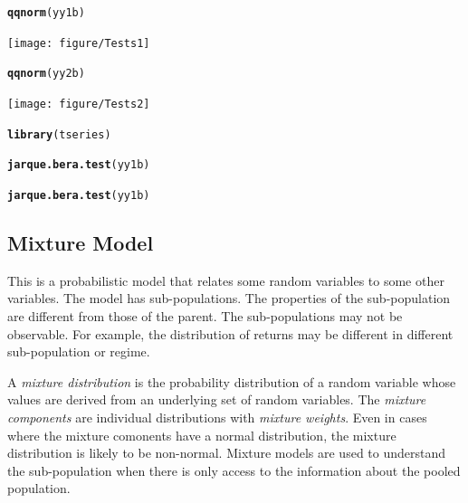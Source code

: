\documentclass[12pt, a4paper, oneside]{article}\usepackage[]{graphicx}\usepackage[]{color}
\makeatletter
\newcommand{\hlkwd}[1]{\textcolor[rgb]{0.737,0.353,0.396}{\textbf{#1}}}%
\newenvironment{kframe}{%
 \def\at@end@of@kframe{}%
 \ifinner\ifhmode%
  \def\at@end@of@kframe{\end{minipage}}%
  \begin{minipage}{\columnwidth}%
 \fi\fi%
 \def\FrameCommand##1{\hskip\@totalleftmargin \hskip-\fboxsep
 \colorbox{shadecolor}{##1}\hskip-\fboxsep
     \hskip-\linewidth \hskip-\@totalleftmargin \hskip\columnwidth}%
 \MakeFramed {\advance\hsize-\width
   \@totalleftmargin\z@ \linewidth\hsize
   \@setminipage}}%
 {\par\unskip\endMakeFramed%
 \at@end@of@kframe}
\newenvironment{knitrout}{}{} %
\makeatother
\begin{document}
\begin{knitrout}
\color{fgcolor}\begin{kframe}
\begin{alltt}
\hlkwd{qqnorm}(yy1b)
\end{alltt}
\end{kframe}
\texttt{[image: figure/Tests1]} 
\begin{kframe}\begin{alltt}
\hlkwd{qqnorm}(yy2b)
\end{alltt}
\end{kframe}
\texttt{[image: figure/Tests2]} 
\begin{kframe}\begin{alltt}
\hlkwd{library}(tseries)
\end{alltt}


{\ttfamily\noindent\bfseries\color{errorcolor}{\#\# Error: there is no package called 'tseries'}}\begin{alltt}
\hlkwd{jarque.bera.test}(yy1b)
\end{alltt}


{\ttfamily\noindent\bfseries{}}\begin{alltt}
\hlkwd{jarque.bera.test}(yy1b)
\end{alltt}


{\ttfamily\noindent\bfseries{}}\end{kframe}
\end{knitrout}


\subsection{Mixture Model}
This is a probabilistic model that relates some random variables to some other variables.  The model has sub-populations. The properties of the sub-population are different from those of the parent. The sub-populations may not be observable.  For example, the distribution of returns may be different in different sub-population or regime. 

A \emph{mixture distribution} is the probability distribution of a random variable  whose values are derived from an underlying set of random variables. The \emph{mixture components} are individual distributions with \emph{mixture weights}.  Even in cases where the mixture comonents have a normal distribution, the mixture distribution is likely to be non-normal. Mixture models are used to understand the sub-population when there is only access to the information about the pooled population. 
\end{document}
